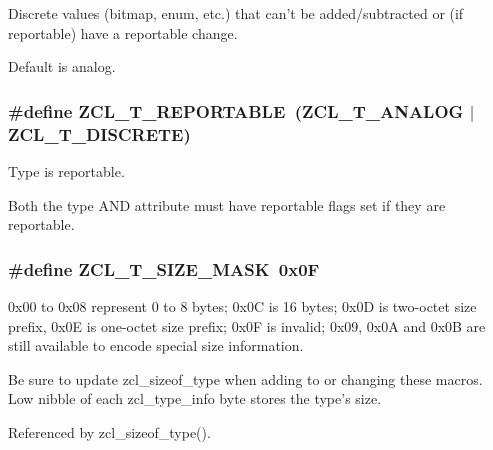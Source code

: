 Discrete values (bitmap, enum, etc.) that can't be added/subtracted or (if reportable) have a reportable change. 

Default is analog. \hypertarget{group__zcl__types_gab0e5c23a0877c17fde12043c85728c29}{
\subsubsection[{Z\-C\-L\-\_\-\-T\-\_\-\-R\-E\-P\-O\-R\-T\-A\-B\-L\-E}]{\setlength{\rightskip}{0pt plus 5cm}\#define Z\-C\-L\-\_\-\-T\-\_\-\-R\-E\-P\-O\-R\-T\-A\-B\-L\-E~({\bf Z\-C\-L\-\_\-\-T\-\_\-\-A\-N\-A\-L\-O\-G} $|$ {\bf Z\-C\-L\-\_\-\-T\-\_\-\-D\-I\-S\-C\-R\-E\-T\-E})}}\label{group__zcl__types_gab0e5c23a0877c17fde12043c85728c29}


Type is reportable. 

Both the type A\-N\-D attribute must have reportable flags set if they are reportable. \hypertarget{group__zcl__types_gaa49518f03f9632a55b3e1c4d4c68b60c}{
\subsubsection[{Z\-C\-L\-\_\-\-T\-\_\-\-S\-I\-Z\-E\-\_\-\-M\-A\-S\-K}]{\setlength{\rightskip}{0pt plus 5cm}\#define Z\-C\-L\-\_\-\-T\-\_\-\-S\-I\-Z\-E\-\_\-\-M\-A\-S\-K~0x0\-F}}\label{group__zcl__types_gaa49518f03f9632a55b3e1c4d4c68b60c}


0x00 to 0x08 represent 0 to 8 bytes; 0x0\-C is 16 bytes; 0x0\-D is two-\/octet size prefix, 0x0\-E is one-\/octet size prefix; 0x0\-F is invalid; 0x09, 0x0\-A and 0x0\-B are still available to encode special size information. 

Be sure to update zcl\-\_\-sizeof\-\_\-type when adding to or changing these macros. Low nibble of each zcl\-\_\-type\-\_\-info byte stores the type's size. 

Referenced by zcl\-\_\-sizeof\-\_\-type().


